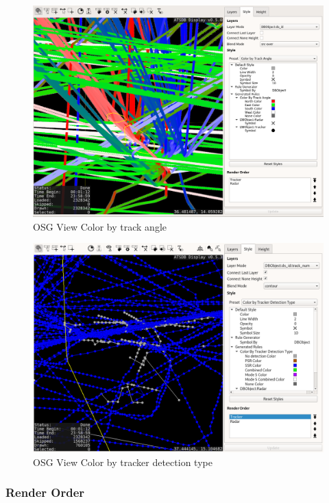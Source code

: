 \begin{figure}[H]
    \hspace*{-2.5cm}
    \includegraphics[width=19cm,frame]{../screenshots/osgview_style_track_angle.png}
  \caption{OSG View Color by track angle}
\end{figure}

\begin{figure}[H]
    \hspace*{-2.5cm}
    \includegraphics[width=19cm,frame]{../screenshots/osgview_style_tracker_detection_type.png}
  \caption{OSG View Color by tracker detection type}
\end{figure}


\subsubsection{Render Order}

